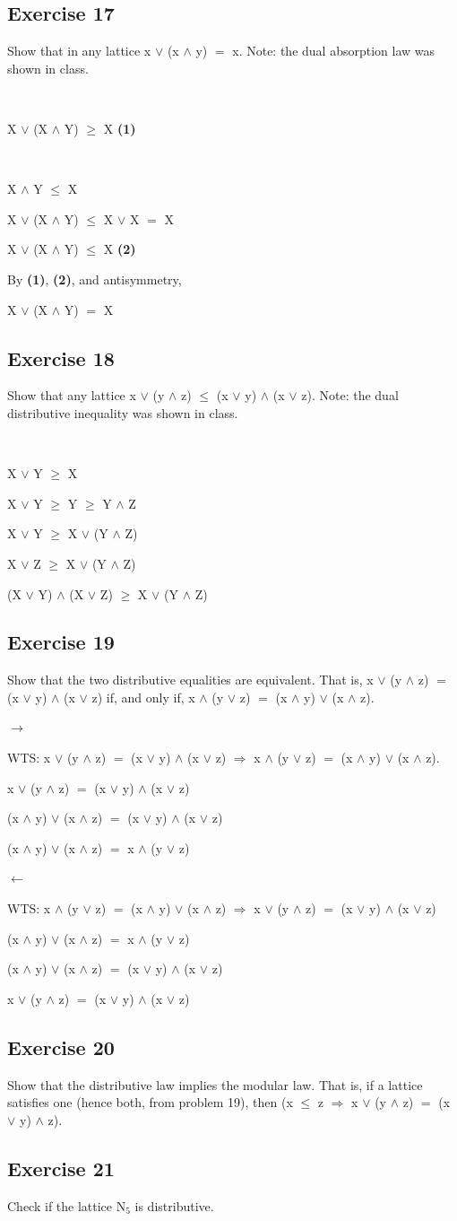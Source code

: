 \documentclass{article}
\newcommand{\mt}[1]{\ensuremath{#1}}
\newcommand\ssc[2][\DefaultOpt]{%
  \def\DefaultOpt{#2}%
  \subsection[#1]{#2}%
}
\newcommand{\bpth}[1]{\textbf{(#1)}}
\newcommand{\lra}{ \mt{\longrightarrow} } %
\newcommand{\rar}{ \mt{\Rightarrow} }     %
\newcommand{\lla}{ \mt{\longleftarrow} }  %
\newcommand{\lse}{\mt{\leq} }
\newcommand{\gre}{\mt{\geq} }
\newcommand{\eql}{\mt{=} }
\newcommand{\uw}[2]{#1\mt{_{#2}}}
\newcommand{\lgnd}{\mt{\land} }
\newcommand{\lgor}{\mt{\lor} }
\begin{document}
\ssc{Exercise 17}{

Show that in any lattice x \lgor (x \lgnd y) \eql x. Note: the dual absorption law was shown in class.

\

X \lgor (X \lgnd Y) \gre X \bpth{1}

\

X \lgnd Y \lse X

X \lgor (X \lgnd Y) \lse X \lgor X \eql X

X \lgor (X \lgnd Y) \lse X \bpth{2}

By \bpth{1}, \bpth{2}, and antisymmetry, 

X \lgor (X \lgnd Y) \eql X



}

\ssc{Exercise 18}{

Show that any lattice x \lgor (y \lgnd z) \lse (x \lgor y) \lgnd (x \lgor z). Note: the dual distributive inequality was shown in class.

\

X \lgor Y \gre X

X \lgor Y \gre Y \gre Y \lgnd Z

X \lgor Y \gre X \lgor (Y \lgnd Z)

X \lgor Z \gre X \lgor (Y \lgnd Z) 

(X \lgor Y) \lgnd (X \lgor Z) \gre X \lgor (Y \lgnd Z)

}

\ssc{Exercise 19}{

Show that the two distributive equalities are equivalent. That is, x \lgor (y \lgnd z) \eql (x \lgor y) \lgnd (x \lgor z) if, and only if, x \lgnd (y \lgor z) \eql (x \lgnd y) \lgor (x \lgnd z).

\lra

WTS: x \lgor (y \lgnd z) \eql (x \lgor y) \lgnd (x \lgor z) \rar x \lgnd (y \lgor z) \eql (x \lgnd y) \lgor (x \lgnd z).

x \lgor (y \lgnd z) \eql (x \lgor y) \lgnd (x \lgor z)

(x \lgnd y) \lgor (x \lgnd z) \eql (x \lgor y) \lgnd (x \lgor z)

(x \lgnd y) \lgor (x \lgnd z) \eql x \lgnd (y \lgor z)

\lla 

WTS: x \lgnd (y \lgor z) \eql (x \lgnd y) \lgor (x \lgnd z) \rar x \lgor (y \lgnd z) \eql (x \lgor y) \lgnd (x \lgor z)

(x \lgnd y) \lgor (x \lgnd z) \eql x \lgnd (y \lgor z)

(x \lgnd y) \lgor (x \lgnd z) \eql (x \lgor y) \lgnd (x \lgor z)

x \lgor (y \lgnd z) \eql (x \lgor y) \lgnd (x \lgor z)

}

\ssc{Exercise 20}{

Show that the distributive law implies the modular law. That is, if a lattice satisfies one (hence both, from problem 19), then (x \lse z \rar x \lgor (y \lgnd z) \eql (x \lgor y) \lgnd z).

}

\ssc{Exercise 21}{

Check if the lattice \uw{N}{5} is distributive.

}
\end{document}
